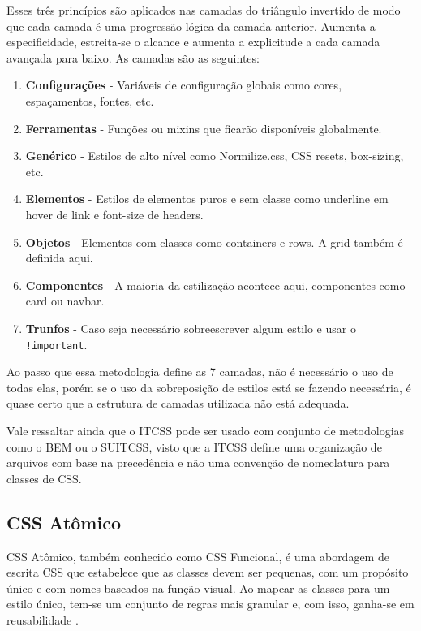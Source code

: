 Esses três princípios são aplicados nas camadas do triângulo invertido
de modo que cada camada é uma progressão lógica da camada anterior.
Aumenta a especificidade, estreita-se o alcance e aumenta a explicitude
a cada camada avançada para baixo. As camadas são as seguintes:

\begin{enumerate}
\def\labelenumi{\arabic{enumi}.}
\tightlist
\item
  \textbf{Configurações} - Variáveis de configuração globais como cores,
  espaçamentos, fontes, etc.
\item
  \textbf{Ferramentas} - Funções ou mixins que ficarão disponíveis
  globalmente.
\item
  \textbf{Genérico} - Estilos de alto nível como Normilize.css, CSS
  resets, box-sizing, etc.
\item
  \textbf{Elementos} - Estilos de elementos puros e sem classe como
  underline em hover de link e font-size de headers.
\item
  \textbf{Objetos} - Elementos com classes como containers e rows. A
  grid também é definida aqui.
\item
  \textbf{Componentes} - A maioria da estilização acontece aqui,
  componentes como card ou navbar.
\item
  \textbf{Trunfos} - Caso seja necessário sobreescrever algum estilo e
  usar o \texttt{!important}.
\end{enumerate}

Ao passo que essa metodologia define as 7 camadas, não é necessário o
uso de todas elas, porém se o uso da sobreposição de estilos está se
fazendo necessária, é quase certo que a estrutura de camadas utilizada
não está adequada.

Vale ressaltar ainda que o ITCSS pode ser usado com conjunto de
metodologias como o BEM ou o SUITCSS, visto que a ITCSS define uma
organização de arquivos com base na precedência e não uma convenção de nomeclatura para classes de CSS.

\hypertarget{css-atuxf4mico}{%
\subsection{CSS Atômico}\label{css-atuxf4mico}}

CSS Atômico, também conhecido como CSS Funcional, é uma abordagem de
escrita CSS que estabelece que as classes devem ser pequenas, com um
propósito único e com nomes baseados na função visual. Ao mapear as classes para um estilo único, tem-se um conjunto
de regras mais granular e, com isso, ganha-se em reusabilidade \cite{koblentz}.

